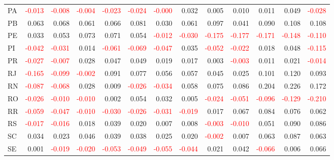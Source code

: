 \begin{table}[!htb]
{\begin{tabular}{lrrrrrrrrrrrr}
      PA & \textcolor{red}{-0.013} & \textcolor{red}{-0.008} & \textcolor{red}{-0.004} & \textcolor{red}{-0.023} & \textcolor{red}{-0.024} & \textcolor{red}{-0.000} & 0.032 & 0.005 & 0.010 & 0.011 & 0.049 & \textcolor{red}{-0.028} \\
      PB & 0.063 & 0.068 & 0.061 & 0.066 & 0.081 & 0.030 & 0.061 & 0.097 & 0.041 & 0.090 & 0.108 & 0.108 \\
      PE & 0.033 & 0.053 & 0.073 & 0.071 & 0.054 & \textcolor{red}{-0.012} & \textcolor{red}{-0.030} & \textcolor{red}{-0.175} & \textcolor{red}{-0.177} & \textcolor{red}{-0.171} & \textcolor{red}{-0.148} & \textcolor{red}{-0.110} \\
      PI & \textcolor{red}{-0.042} & \textcolor{red}{-0.031} & 0.014 & \textcolor{red}{-0.061} & \textcolor{red}{-0.069} & \textcolor{red}{-0.047} & 0.035 & \textcolor{red}{-0.052} & \textcolor{red}{-0.022} & 0.018 & 0.048 & \textcolor{red}{-0.115} \\
      PR & \textcolor{red}{-0.027} & \textcolor{red}{-0.007} & 0.028 & 0.047 & 0.049 & 0.019 & 0.017 & 0.003 & \textcolor{red}{-0.003} & 0.011 & 0.021 & \textcolor{red}{-0.014} \\
      RJ & \textcolor{red}{-0.165} & \textcolor{red}{-0.099} & \textcolor{red}{-0.002} & 0.091 & 0.077 & 0.056 & 0.057 & 0.045 & 0.025 & 0.101 & 0.120 & 0.093 \\
      RN & \textcolor{red}{-0.087} & \textcolor{red}{-0.068} & 0.028 & 0.009 & \textcolor{red}{-0.026} & \textcolor{red}{-0.034} & 0.058 & 0.075 & 0.086 & 0.204 & 0.226 & 0.172 \\
      RO & \textcolor{red}{-0.026} & \textcolor{red}{-0.010} & \textcolor{red}{-0.010} & 0.002 & 0.054 & 0.032 & 0.005 & \textcolor{red}{-0.024} & \textcolor{red}{-0.051} & \textcolor{red}{-0.096} & \textcolor{red}{-0.129} & \textcolor{red}{-0.210} \\
      RR & \textcolor{red}{-0.059} & \textcolor{red}{-0.047} & \textcolor{red}{-0.010} & \textcolor{red}{-0.030} & \textcolor{red}{-0.026} & \textcolor{red}{-0.031} & \textcolor{red}{-0.019} & 0.017 & 0.067 & 0.084 & 0.076 & 0.062 \\
      RS & \textcolor{red}{-0.017} & \textcolor{red}{-0.016} & 0.018 & 0.039 & 0.020 & 0.007 & 0.008 & \textcolor{red}{-0.003} & \textcolor{red}{-0.010} & 0.051 & 0.090 & 0.086 \\
      SC & 0.034 & 0.023 & 0.046 & 0.039 & 0.038 & 0.025 & 0.020 & \textcolor{red}{-0.002} & 0.007 & 0.063 & 0.087 & 0.063 \\
      SE & 0.001 & \textcolor{red}{-0.019} & \textcolor{red}{-0.020} & \textcolor{red}{-0.053} & \textcolor{red}{-0.049} & \textcolor{red}{-0.055} & \textcolor{red}{-0.044} & 0.021 & 0.042 & \textcolor{red}{-0.066} & 0.006 & 0.066 \\

\end{tabular}}
\end{table}
